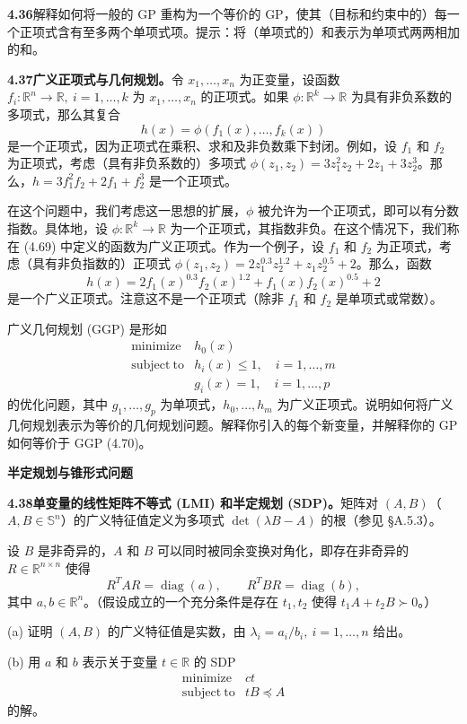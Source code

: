 \documentclass[UTF8, 12pt, fontset=fandol, oneside]{ctexart}
\begin{document}
\noindent\textbf{4.36}\quad 解释如何将一般的 GP 重构为一个等价的 GP，使其（目标和约束中的）每一个正项式含有至多两个单项式项。提示：将（单项式的）和表示为单项式两两相加的和。

\noindent\textbf{4.37\quad 广义正项式与几何规划。}\quad 令 $x_1,\ldots,x_n$ 为正变量，设函数 $f_i:\mathbb{R}^n\to\mathbb{R},\ i=1,\ldots,k$ 为 $x_1,\ldots,x_n$ 的正项式。如果 $\phi:\mathbb{R}^k\to\mathbb{R}$ 为具有非负系数的多项式，那么其复合
\[
h(x)=\phi(f_1(x),\ldots,f_k(x))
\tag{4.69}
\]
是一个正项式，因为正项式在乘积、求和及非负数乘下封闭。例如，设 $f_1$ 和 $f_2$ 为正项式，考虑（具有非负系数的）多项式 $\phi(z_1,z_2)=3z_1^2z_2+2z_1+3z_2^3$。那么，$h=3f_1^2f_2+2f_1+f_2^3$ 是一个正项式。

在这个问题中，我们考虑这一思想的扩展，$\phi$ 被允许为一个正项式，即可以有分数指数。具体地，设 $\phi:\mathbb{R}^k\to\mathbb{R}$ 为一个正项式，其指数非负。在这个情况下，我们称在 (4.69) 中定义的函数为广义正项式。作为一个例子，设 $f_1$ 和 $f_2$ 为正项式，考虑（具有非负指数的）正项式 $\phi(z_1,z_2)=2z_1^{0.3}z_2^{1.2}+z_1z_2^{0.5}+2$。那么，函数
\[
h(x)=2f_1(x)^{0.3}f_2(x)^{1.2}+f_1(x)f_2(x)^{0.5}+2
\]
是一个广义正项式。注意这不是一个正项式（除非 $f_1$ 和 $f_2$ 是单项式或常数）。

广义几何规划 (GGP) 是形如
\[
\begin{array}{ll}
\mathop{\mathrm{minimize}} & h_0(x)\\
\mathrm{subject\ to} & h_i(x)\leq1,\quad i=1,\ldots,m\\
& g_i(x)=1,\quad i=1,\ldots,p
\end{array}
\tag{4.70}
\]
的优化问题，其中 $g_1,\ldots,g_p$ 为单项式，$h_0,\ldots,h_m$ 为广义正项式。说明如何将广义几何规划表示为等价的几何规划问题。解释你引入的每个新变量，并解释你的 GP 如何等价于 GGP (4.70)。

\noindent\textbf{半定规划与锥形式问题}

\noindent\textbf{4.38\quad 单变量的线性矩阵不等式 (LMI) 和半定规划 (SDP)。}\quad 矩阵对 $(A,B)$（$A,B\in\mathbb{S}^n$）的广义特征值定义为多项式 $\det(\lambda B-A)$ 的根（参见 \S A.5.3）。

设 $B$ 是非奇异的，$A$ 和 $B$ 可以同时被同余变换对角化，即存在非奇异的 $R\in\mathbb{R}^{n\times n}$ 使得
\[
R^TAR=\operatorname{diag}(a),\qquad R^TBR=\operatorname{diag}(b),
\]
其中 $a,b\in\mathbb{R}^n$。（假设成立的一个充分条件是存在 $t_1,t_2$ 使得 $t_1A+t_2B\succ0$。）

(a) 证明 $(A,B)$ 的广义特征值是实数，由 $\lambda_i=a_i/b_i,\ i=1,\ldots,n$ 给出。

(b) 用 $a$ 和 $b$ 表示关于变量 $t\in\mathbb{R}$ 的 SDP
\[
\begin{array}{ll}
\mathop{\mathrm{minimize}} & ct\\
\mathrm{subject\ to} & tB\preceq A
\end{array}
\]
的解。
\end{document}
